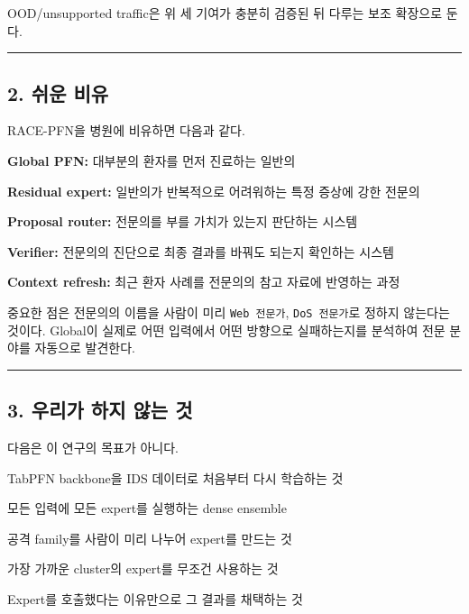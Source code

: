 OOD/\allowbreak{}unsupported traffic은 위 세 기여가 충분히 검증된 뒤 다루는 보조 확장으로 둔다.


\medskip\hrule\medskip
\subsection{2. 쉬운 비유}
RACE-PFN을 병원에 비유하면 다음과 같다.

\par\noindent \textbullet\enspace \textbf{Global PFN:} 대부분의 환자를 먼저 진료하는 일반의


\par\noindent \textbullet\enspace \textbf{Residual expert:} 일반의가 반복적으로 어려워하는 특정 증상에 강한 전문의


\par\noindent \textbullet\enspace \textbf{Proposal router:} 전문의를 부를 가치가 있는지 판단하는 시스템


\par\noindent \textbullet\enspace \textbf{Verifier:} 전문의의 진단으로 최종 결과를 바꿔도 되는지 확인하는 시스템


\par\noindent \textbullet\enspace \textbf{Context refresh:} 최근 환자 사례를 전문의의 참고 자료에 반영하는 과정


중요한 점은 전문의의 이름을 사람이 미리 \texttt{Web 전문가}, \texttt{DoS 전문가}로 정하지 않는다는 것이다. Global이 실제로 어떤 입력에서 어떤 방향으로 실패하는지를 분석하여 전문 분야를 자동으로 발견한다.


\medskip\hrule\medskip
\subsection{3. 우리가 하지 않는 것}
다음은 이 연구의 목표가 아니다.

\par\noindent \textbullet\enspace TabPFN backbone을 IDS 데이터로 처음부터 다시 학습하는 것


\par\noindent \textbullet\enspace 모든 입력에 모든 expert를 실행하는 dense ensemble


\par\noindent \textbullet\enspace 공격 family를 사람이 미리 나누어 expert를 만드는 것


\par\noindent \textbullet\enspace 가장 가까운 cluster의 expert를 무조건 사용하는 것


\par\noindent \textbullet\enspace Expert를 호출했다는 이유만으로 그 결과를 채택하는 것


